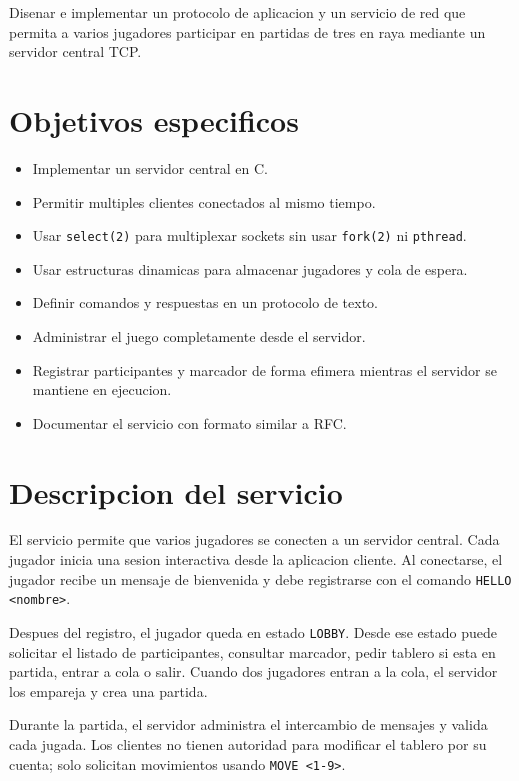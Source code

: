 \documentclass[12pt,a4paper]{article}
\begin{document}
Disenar e implementar un protocolo de aplicacion y un servicio de red que
permita a varios jugadores participar en partidas de tres en raya mediante un
servidor central TCP.

\section{Objetivos especificos}

\begin{itemize}
    \item Implementar un servidor central en C.
    \item Permitir multiples clientes conectados al mismo tiempo.
    \item Usar \texttt{select(2)} para multiplexar sockets sin usar
    \texttt{fork(2)} ni \texttt{pthread}.
    \item Usar estructuras dinamicas para almacenar jugadores y cola de espera.
    \item Definir comandos y respuestas en un protocolo de texto.
    \item Administrar el juego completamente desde el servidor.
    \item Registrar participantes y marcador de forma efimera mientras el
    servidor se mantiene en ejecucion.
    \item Documentar el servicio con formato similar a RFC.
\end{itemize}

\section{Descripcion del servicio}

El servicio permite que varios jugadores se conecten a un servidor central.
Cada jugador inicia una sesion interactiva desde la aplicacion cliente. Al
conectarse, el jugador recibe un mensaje de bienvenida y debe registrarse con
el comando \texttt{HELLO <nombre>}.

Despues del registro, el jugador queda en estado \texttt{LOBBY}. Desde ese
estado puede solicitar el listado de participantes, consultar marcador, pedir
tablero si esta en partida, entrar a cola o salir. Cuando dos jugadores entran
a la cola, el servidor los empareja y crea una partida.

Durante la partida, el servidor administra el intercambio de mensajes y valida
cada jugada. Los clientes no tienen autoridad para modificar el tablero por su
cuenta; solo solicitan movimientos usando \texttt{MOVE <1-9>}.
\end{document}
